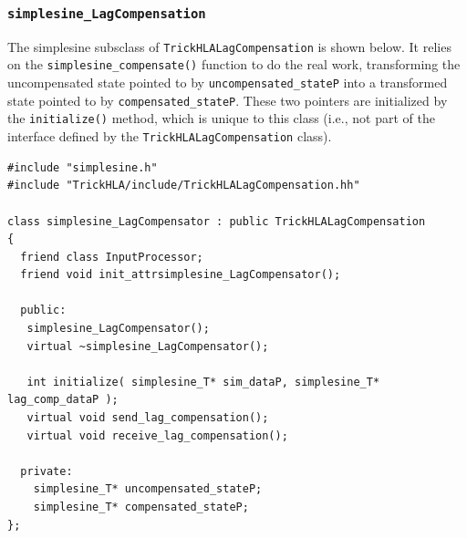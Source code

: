\subsubsection{\tt simplesine\_LagCompensation}

The simplesine subsclass of {\tt TrickHLALagCompensation} is shown below.
It relies on the {\tt simple\-sine\-\_comp\-ensate()} function to do the real work, transforming the uncompensated state pointed to by
{\tt uncompensated\_stateP}
into a transformed state pointed to by
{\tt compensated\_stateP}.
These two pointers are initialized by the {\tt initialize()} method,
which is unique to this class (i.e., not part of the interface defined by the
{\tt TrickHLALagCompensation} class).

\begin{lstlisting}[caption={The {\tt simplesine\_LagCompensation} class header},label={list:simplesine-LagCompensation-header}]
#include "simplesine.h"
#include "TrickHLA/include/TrickHLALagCompensation.hh"

class simplesine_LagCompensator : public TrickHLALagCompensation
{
  friend class InputProcessor;
  friend void init_attrsimplesine_LagCompensator();

  public:
   simplesine_LagCompensator();
   virtual ~simplesine_LagCompensator();

   int initialize( simplesine_T* sim_dataP, simplesine_T* lag_comp_dataP );
   virtual void send_lag_compensation();
   virtual void receive_lag_compensation();

  private:
    simplesine_T* uncompensated_stateP;
    simplesine_T* compensated_stateP;
};
\end{lstlisting}

